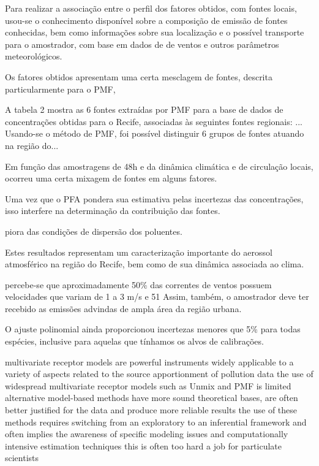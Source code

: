 Para realizar a associação entre o perfil dos fatores obtidos, com fontes locais, usou-se o conhecimento disponível sobre a composição de emissão de fontes conhecidas, bem como  informações sobre sua localização e o possível transporte para o amostrador, com base em dados de de ventos e outros parâmetros meteorológicos.

Os fatores obtidos apresentam uma certa mesclagem de fontes, descrita particularmente para o PMF,

A tabela 2 mostra as 6 fontes extraídas por PMF para a base de dados de concentrações obtidas para o Recife, associadas às seguintes fontes regionais: ...
Usando-se o método de PMF, foi possível distinguir 6 grupos de fontes atuando na região do... 



Em função das amostragens de 48h e da dinâmica climática e de circulação locais, 
ocorreu uma certa mixagem de fontes em alguns fatores. 

Uma vez que o PFA pondera sua estimativa pelas incertezas das concentrações, 
isso interfere na determinação da contribuição das fontes.

piora das condições de dispersão dos poluentes. 

Estes resultados representam um caracterização importante do aerossol atmosférico na região do Recife, bem como de sua dinâmica associada ao clima.

percebe-se que aproximadamente 50\% das correntes de ventos possuem velocidades que variam de 1 a 3 m/s e 51%
Assim, também, o amostrador deve ter recebido as emissões advindas de ampla área da região urbana. 


O ajuste polinomial ainda proporcionou incertezas menores que 5\% para todas espécies, 
inclusive para aquelas que tínhamos os alvos de calibrações.


multivariate receptor models are powerful instruments widely
applicable to a variety of aspects related to the source apportionment
of pollution data
the use of widespread multivariate receptor models such as Unmix
and PMF is limited
alternative model-based methods have more sound theoretical bases,
are often better justified for the data and produce more reliable results
the use of these methods requires switching from an exploratory to an
inferential framework and often implies the awareness of specific
modeling issues and computationally intensive estimation techniques
this is often too hard a job for particulate scientists

